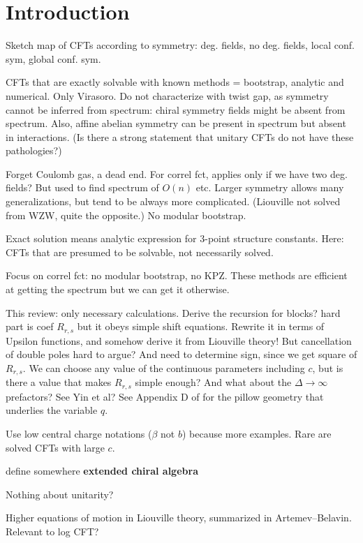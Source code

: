 \documentclass[12pt, a4paper]{article}
\theoremstyle{break}
\begin{document}
\section{Introduction}

Sketch map of CFTs according to symmetry: deg. fields, no deg. fields, local conf. sym, global conf. sym.

CFTs that are exactly solvable with known methods = bootstrap, analytic and numerical. Only Virasoro. Do not characterize with twist gap, as symmetry cannot be inferred from spectrum: chiral symmetry fields might be absent from spectrum. Also, affine abelian symmetry can be present in spectrum but absent in interactions. (Is there a strong statement that unitary CFTs do not have these pathologies?)

Forget Coulomb gas, a dead end. For correl fct, applies only if we have two deg. fields? But used to find spectrum of $O(n)$ etc. Larger symmetry allows many generalizations, but tend to be always more complicated. (Liouville not solved from WZW, quite the opposite.) No modular bootstrap. 

Exact solution means analytic expression for 3-point structure constants. Here: CFTs that are presumed to be solvable, not necessarily solved. 

Focus on correl fct: no modular bootstrap, no KPZ. These methods are efficient at getting the spectrum but we can get it otherwise. 

This review: only necessary calculations. Derive the recursion for blocks? hard part is coef $R_{r,s}$ but it obeys simple shift equations. Rewrite it in terms of Upsilon functions, and somehow derive it from Liouville theory! But cancellation of double poles hard to argue? And need to determine sign, since we get square of $R_{r,s}$. We can choose any value of the continuous parameters including $c$, but is there a value that makes $R_{r,s}$ simple enough? And what about the $\Delta\to\infty$ prefactors? See Yin et al? See Appendix D of \cite{msz15} for the pillow geometry that underlies the variable $q$.

Use low central charge notations ($\beta$ not $b$) because more examples. Rare are solved CFTs with large $c$.

define somewhere \textbf{extended chiral algebra}

Nothing about unitarity?

Higher equations of motion in Liouville theory, summarized in Artemev--Belavin. Relevant to log CFT? 
\end{document}
